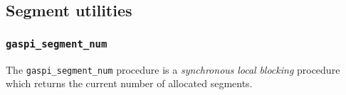 \documentclass[a4paper]{article}
\newlength{\st}\setlength{\st}{0pt}
\newcommand{\zsep}[1]{#1}
\newcommand{\gaspiprefix}{gaspi}
\newcommand{\GASPI}{{\sc Gaspi}}
\newcommand{\function}[1]{{\tt #1}}
\newcommand{\parameter}[1]{{\it #1}}
\newcommand{\gaspifunction}[1]{\function{\protect\zsep{\gaspiprefix\_#1}}}
\newcommand{\GASPITIME}{{\tt\protect\zsep{GASPI\_TIMEOUT}}}
\newcommand{\GASPIGERR}{{\tt\protect\zsep{GASPI\_ERROR}}}
\newcommand{\gaspisemantic}[1]{{\emph{#1}}}
\begin{document}
%
%
%
%
%
%

\subsection{Segment utilities}

\subsubsection{\gaspifunction{segment\_num}}

The \gaspifunction{segment\_num} procedure
is a \gaspisemantic{synchronous} \gaspisemantic{local}
\gaspisemantic{blocking} procedure which returns
the current number of allocated segments.
\end{document}
